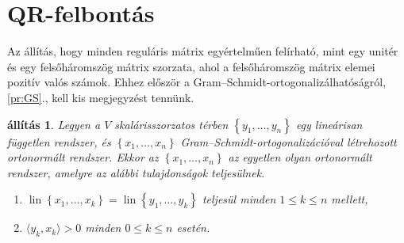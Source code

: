 \documentclass[a4paper, showtrims]{memoir}
\theoremstyle{plain}
\newtheorem{proposition}{állítás}[chapter]
\theoremstyle{remark}
\theoremstyle{definition}
\DeclareMathOperator{\lin}{lin}
\newcommand{\ip}[2]{\langle#1,#2\rangle}
\begin{document}
\section{QR-felbontás}
Az állítás, hogy minden reguláris mátrix egyértelműen felírható, 
mint egy unitér és egy felsőháromszög mátrix szorzata,
ahol a felsőháromszög mátrix elemei pozitív valós számok.
Ehhez először a Gram--Schmidt-ortogonalizálhatóságról, \ref{pr:GS}., kell kis megjegyzést tennünk.
\begin{proposition}
    Legyen a $V$ skalárisszorzatos térben $\left\{ y_1,\dots,y_n \right\}$ egy lineárisan független rendszer,
    és $\left\{ x_1,\dots,x_n \right\}$ Gram--Schmidt-ortogonalizációval létrehozott ortonormált rendszer.
    Ekkor az $\left\{ x_1,\dots,x_n \right\}$ az egyetlen olyan ortonormált rendszer,
    amelyre az alábbi tulajdonságok teljesülnek.
    \begin{enumerate}
        \item $\lin\left\{ x_1,\dots,x_k \right\}=\lin\left\{ y_1,\dots,y_k \right\}$ teljesül minden $1\leq k\leq n$ mellett,
        \item $\ip{y_k}{x_k}>0$ minden $0\leq k\leq n$ esetén.\qedhere
    \end{enumerate}
\end{proposition}
\end{document}
